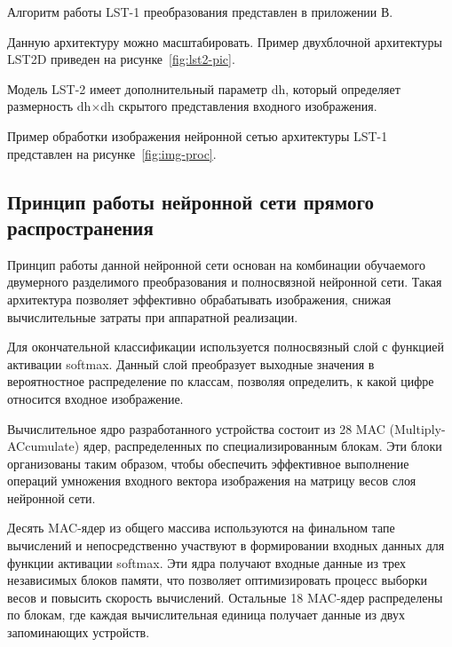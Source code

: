 Алгоритм работы LST-1 преобразования представлен в приложении В.

Данную архитектуру можно масштабировать. Пример двухблочной архитектуры LST2D 
приведен на рисунке~\ref{fig:lst2-pic}\cite{LST2D}.


Модель LST-2 имеет дополнительный параметр dh, который определяет размерность 
dh\(\times\)dh скрытого представления входного изображения.


Пример обработки изображения нейронной сетью архитектуры LST-1 представлен на 
рисунке~\ref{fig:img-proc}\cite{LST2D}.


\subsection{Принцип работы нейронной сети прямого распространения}\par
\hspace*{12.5 mm}Принцип работы данной нейронной сети основан на комбинации 
обучаемого двумерного разделимого преобразования и полносвязной нейронной сети. 
Такая архитектура позволяет эффективно обрабатывать изображения, снижая 
вычислительные затраты при аппаратной реализации.

Для окончательной классификации используется полносвязный слой с функцией 
активации {softmax}. Данный слой преобразует выходные значения в вероятностное 
распределение по классам, позволяя определить, к какой цифре относится входное 
изображение.

Вычислительное ядро разработанного устройства состоит из 28 MAC 
(Multiply-ACcumulate) ядер, распределенных по специализированным блокам. Эти 
блоки организованы таким образом, чтобы обеспечить эффективное выполнение 
операций умножения входного вектора изображения на матрицу весов слоя
нейронной сети.

Десять MAC-ядер из общего массива используются на финальном тапе вычислений и 
непосредственно участвуют в формировании входных данных для функции активации 
softmax. Эти ядра получают входные данные из трех независимых блоков памяти, 
что позволяет оптимизировать процесс выборки весов и повысить скорость 
вычислений. Остальные 18 MAC-ядер распределены по блокам, где каждая 
вычислительная единица получает данные из двух запоминающих устройств.

